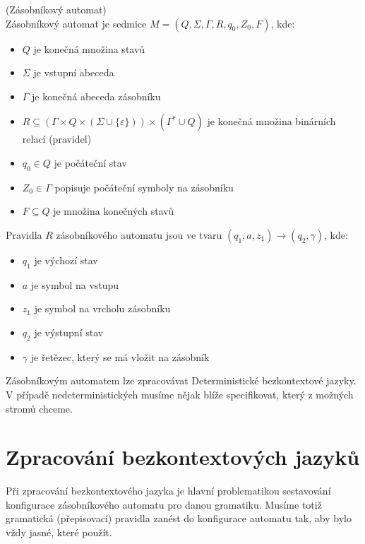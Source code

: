 \begin{defn}
  (Zásobníkový automat)\\
  Zásobníkový automat je sedmice $M = (Q, \Sigma, \Gamma, R, q_0, Z_0, F)$, kde:
  \begin{itemize}
    \item $Q$ je konečná množina stavů
    \item $\Sigma$ je vstupní abeceda
    \item $\Gamma$ je konečná abeceda zásobníku
    \item $R \subseteq (\Gamma \times Q \times (\Sigma \cup \{\varepsilon\} ))
    \times (\Gamma^* \cup Q)$ je konečná množina binárních relací (pravidel)
    \item $q_0 \in Q$ je počáteční stav
    \item $Z_0 \in \Gamma$ popisuje počáteční symboly na zásobníku
    \item $F \subseteq Q$ je množina konečných stavů
  \end{itemize}

  \noindent
  Pravidla $R$ zásobníkového automatu jsou ve tvaru $(q_1, a, z_1) \rightarrow (q_2, \gamma)$, kde:

  \begin{itemize}
    \item $q_1$ je výchozí stav
    \item $a$ je symbol na vstupu
    \item $z_1$ je symbol na vrcholu zásobníku
    \item $q_2$ je výstupní stav
    \item $\gamma$ je řetězec, který se má vložit na zásobník
  \end{itemize}
  \vspace{-0.5cm}
\end{defn}

Zásobníkovým automatem lze zpracovávat Deterministické bezkontextové jazyky.
V případě nedeterministických musíme nějak blíže specifikovat, který z možných
stromů chceme.\\

\section{Zpracování bezkontextových jazyků}
\label{sec:CFLanguagesProcessing}

Při zpracování bezkontextového jazyka je hlavní problematikou
sestavování konfigurace zásobníkového automatu pro danou gramatiku.
Musíme totiž gramatická (přepisovací) pravidla zanést do konfigurace
automatu tak, aby bylo vždy jasné, které použít.\\


